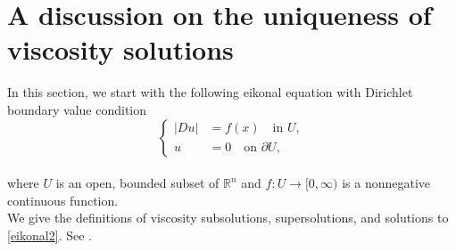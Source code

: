 \documentclass[12pt,reqno]{amsart}
\numberwithin{figure}{section}
\theoremstyle{plain}
\numberwithin{equation}{section}
\begin{document}
\section{A discussion on the uniqueness of viscosity solutions}
In this section, we start with the following eikonal equation with Dirichlet boundary value condition 
\begin{equation}\label{eikonal2}
\left\{
\begin{aligned}
|Du| &= f(x) \quad \text{in } U,\\
u &= 0 \quad \text{on } \partial U,
\end{aligned} 
\right.    
\end{equation}\\
where $U$ is an open, bounded subset of $\mathbb{R}^n$ and $f: U \rightarrow [0,\infty) $ is a nonnegative continuous function.\\
We give the definitions of viscosity subsolutions, supersolutions, and solutions to \eqref{eikonal2}.
See \cite{Tran2021}.
\end{document}

